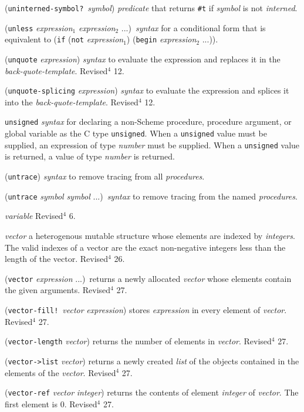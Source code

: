 \documentclass[10pt,twocolumn]{article}
\begin{document}
(\texttt{uninterned-symbol?}\ \emph{symbol}) \emph{predicate} that returns
\texttt{\#t} if \emph{symbol} is not \emph{interned}.

(\texttt{unless} \emph{expression}$_1$ \emph{expression}$_2$ ...)\ \emph{syntax}
for a conditional form that is equivalent to (\texttt{if} (\texttt{not}
\emph{expression}$_1$) (\texttt{begin} \emph{expression}$_2$ ...)).

(\texttt{unquote} \emph{expression}) \emph{syntax} to evaluate the expression
and replaces it in the \emph{back-quote-template}.  Revised$^4$ 12.

(\texttt{unquote-splicing} \emph{expression}) \emph{syntax} to evaluate the
expression and splices it into the \emph{back-quote-template}.
Revised$^4$ 12.

\texttt{unsigned} \emph{syntax} for declaring a non-Scheme procedure,
procedure argument, or global variable as the C type \texttt{unsigned}.
When a \texttt{unsigned} value must be supplied, an expression of type
\emph{number} must be supplied.  When a \texttt{unsigned} value is returned,
a value of type \emph{number} is returned.

(\texttt{untrace}) \emph{syntax} to remove tracing from all \emph{procedures}.

(\texttt{untrace} \emph{symbol} \emph{symbol} ...)\ \emph{syntax} to remove tracing from the
named \emph{procedures}.

\emph{variable} Revised$^4$ 6.

\emph{vector} a heterogenous mutable structure whose elements are
indexed by \emph{integers}.  The valid indexes of a vector are
the exact non-negative integers less than the length of the
vector. Revised$^4$ 26.

(\texttt{vector} \emph{expression} ...)\ returns a newly allocated
\emph{vector} whose elements contain the given arguments.
Revised$^4$ 27.

(\texttt{vector-fill!}\ \emph{vector} \emph{expression}) stores \emph{expression} in
every element of \emph{vector}.  Revised$^4$ 27.

(\texttt{vector-length} \emph{vector}) returns the number of elements in
\emph{vector}.  Revised$^4$ 27.

(\texttt{vector->list} \emph{vector}) returns a newly created \emph{list} of the
objects contained in the elements of the \emph{vector}.  Revised$^4$ 27.

(\texttt{vector-ref} \emph{vector} \emph{integer}) returns the contents of
element \emph{integer} of \emph{vector}.  The first element is 0.
Revised$^4$ 27.
\end{document}
